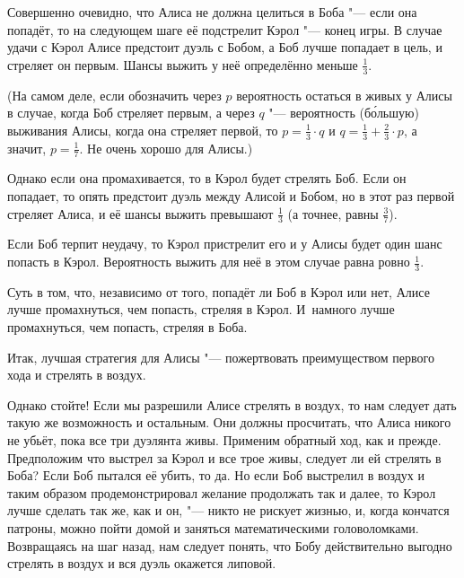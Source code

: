 \documentclass[twoside]{book}
\begin{document}
\medskip

Совершенно очевидно, что Алиса не должна целиться в Боба "--- если она попадёт, то на следующем шаге её подстрелит Кэрол "--- конец игры.
В случае удачи с Кэрол Алисе предстоит дуэль с Бобом, а Боб лучше попадает в цель, и стреляет он первым.
Шансы выжить у неё определённо меньше $\tfrac13$.

(На самом деле, если обозначить через $p$ вероятность остаться в живых у Алисы в случае, когда Боб стреляет первым, а через $q$ "--- вероятность (б\'{о}льшую) выживания Алисы, когда она стреляет первой, то $p=\tfrac13\cdot q$ и $q=\tfrac13+\tfrac23\cdot p$, а значит, $p=\tfrac17$.
Не очень хорошо для Алисы.)

Однако если она промахивается, то в Кэрол будет стрелять Боб.
Если он попадает, то опять предстоит дуэль между Алисой и Бобом, но в этот раз первой стреляет Алиса, и её шансы выжить превышают $\tfrac13$ (а точнее, равны $\tfrac37$).

Если Боб терпит неудачу, то Кэрол пристрелит его и у Алисы будет один шанс попасть в Кэрол.
Вероятность выжить для неё в этом случае равна ровно $\tfrac13$.

Суть в том, что, независимо от того, попадёт ли Боб в Кэрол или нет, Алисе лучше промахнуться, чем попасть, стреляя в Кэрол.
И~намного лучше промахнуться, чем попасть, стреляя в Боба.

Итак, лучшая стратегия для Алисы "--- пожертвовать преимуществом первого хода и стрелять в воздух.

\medskip

Однако стойте!
Если мы разрешили Алисе стрелять в воздух, то нам следует дать такую же возможность и остальным. 
Они должны просчитать, что Алиса никого не убьёт, пока все три дуэлянта живы. 
Применим обратный ход, как и прежде.
Предположим что выстрел за Кэрол и все трое живы,
следует ли ей стрелять в Боба? 
Если Боб пытался её убить, то да.
Но если Боб выстрелил в воздух и таким образом продемонстрировал желание продолжать так и далее,
то Кэрол лучше сделать так же, как и он, "---
никто не рискует жизнью, и, когда кончатся патроны, можно пойти домой и заняться математическими головоломками.
Возвращаясь на шаг назад, нам следует понять, что Бобу действительно выгодно стрелять в воздух и вся дуэль окажется липовой.
\end{document}
